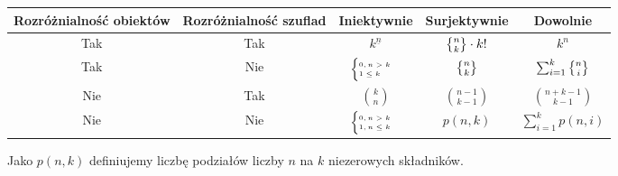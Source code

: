 \begin{table}[h]
	\centering
	\begin{tabular}{@{}cc|ccc@{}}
		\toprule
		Rozróżnialność obiektów & Rozróżnialność szuflad & Iniektywnie                                           & Surjektywnie               & Dowolnie                       \\ \midrule
		Tak                     & Tak                    & $k^{\underline{n}}$                                   & $\stirling{n}{k} \cdot k!$ & $k^n$                          \\
		Tak                     & Nie                    & $\tiny \begin{cases} 0, n>k \\ 1 \leq k\end{cases}$   & $\stirling{n}{k}$          & $\sum_{i=1}^k \stirling{n}{i}$ \\
		Nie                     & Tak                    & $\binom{k}{n} $                                       & $\binom{n-1}{k-1}$         & $\binom{n+k-1}{k-1}$           \\
		Nie                     & Nie                    & $\tiny\begin{cases}0, n>k \\ 1, n \leq k \end{cases}$ & $p(n,k)$                   & $\sum_{i=1}^k p(n,i)$          \\ \bottomrule
	\end{tabular}
\end{table}

Jako $p(n,k)$ definiujemy liczbę podziałów liczby $n$ na $k$ niezerowych składników.